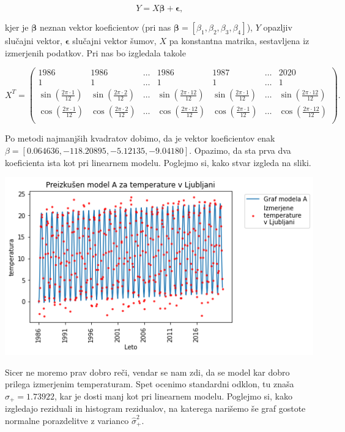\documentclass[12pt, a4paper]{article}
\begin{document}
$$ Y = X\boldsymbol{\beta} + \boldsymbol{\epsilon} \text{,}
$$

kjer je $\boldsymbol{\beta}$ neznan vektor koeficientov (pri nas $\boldsymbol{\beta} = 
[\beta_1, \beta_2, \beta_3, \beta_4]$), $Y$ opazljiv slučajni vektor, 
$\boldsymbol{\epsilon}$ slučajni vektor šumov, $X$ pa konstantna matrika, sestavljena 
iz izmerjenih podatkov. Pri nas bo izgledala takole

$$
X^T =
\left( \begin{array}{ccccccc}
    1986& 1986  & \ldots    & 1986  & 1987  & \ldots    & 2020  \\
    1   & 1     & \ldots    & 1     & 1     & \ldots    & 1     \\
    \sin(\frac{2\pi\cdot1}{12}) & \sin(\frac{2\pi\cdot2}{12}) & \ldots &
    \sin(\frac{2\pi\cdot12}{12}) & \sin(\frac{2\pi\cdot1}{12}) &
    \ldots  & \sin(\frac{2\pi\cdot12}{12})   \\
    \cos(\frac{2\pi\cdot1}{12}) & \cos(\frac{2\pi\cdot2}{12}) & \ldots &
    \cos(\frac{2\pi\cdot12}{12}) & \cos(\frac{2\pi\cdot1}{12}) &
    \ldots  & \cos(\frac{2\pi\cdot12}{12})   \\
    \end{array} \right)
    \text{.}
$$

Po metodi najmanjših kvadratov dobimo, da je vektor koeficientov enak 
$\beta = [0.064636, -118.20895, -5.12135, -9.04180]$. Opazimo, da sta prva 
dva koeficienta ista kot pri linearnem modelu. Poglejmo si, kako stvar izgleda 
na sliki.

\begin{center}
    \includegraphics[scale=0.5]{Naloga_3_05}
\end{center}

Sicer ne moremo prav dobro reči, vendar se nam zdi, da se model kar dobro prilega 
izmerjenim temperaturam. Spet ocenimo standardni odklon, tu znaša $\hat{\sigma}_+ 
= 1.73922$, kar je dosti manj kot pri linearnem modelu. Poglejmo si, kako izgledajo 
reziduali in histogram rezidualov, na katerega narišemo še graf gostote normalne 
porazdelitve z varianco $\hat{\sigma}_+^2$.
\end{document}
